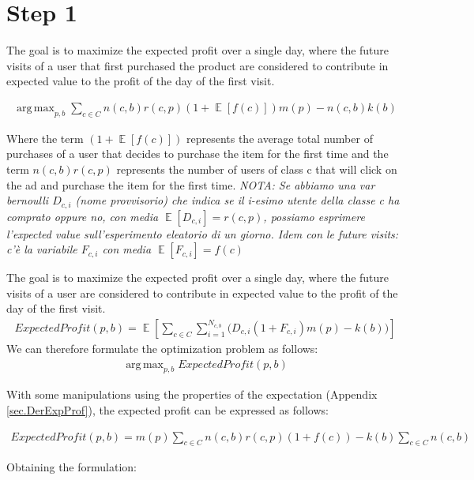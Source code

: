 \documentclass[11pt]{article} %
\DeclareMathOperator{\EX}{\mathbb{E}}
\DeclareMathOperator*{\argmax}{arg\,max}
\begin{document}
\section{Step 1}
{\color{red}
The goal is to maximize the expected profit over a single day, where the future visits of a user that first purchased the product are considered to contribute in expected value to the profit of the day of the first visit.

\begin{align*}
\argmax_{p,b}{\sum_{c \in C}{n(c,b)r(c,p)(1+\EX[f(c)])m(p)-n(c,b)k(b)}}
\end{align*}

Where the term $(1+\EX[f(c)])$ represents the average total number of purchases of a user that decides to purchase the item for the first time and the term $n(c,b)r(c,p)$ represents the number of users of class c that will click on the ad and purchase the item for the first time.
\newline
\newline
\textit{NOTA: Se abbiamo una var bernoulli $D_{c,i}$ (nome provvisorio) che indica se il i-esimo utente della classe c ha comprato oppure no, con media $\EX[D_{c,i}]=r(c,p)$, possiamo esprimere l'expected value sull'esperimento eleatorio di un giorno.
Idem con le future visits: c'è la variabile $F_{c,i}$ con media $\EX[F_{c,i}]=f(c)$}
}
\newline
\newline
The goal is to maximize the expected profit over a single day, where the future visits of a user are considered to contribute in expected value to the profit of the day of the first visit.
\begin{align*}
ExpectedProfit(p,b) = \EX\left[\sum_{c \in C}{\sum_{i =1}^{N_{c,b}}{\bigg( D_{c,i}(1+F_{c,i})m(p)-k(b)\bigg)}}\right]
\end{align*}
We can therefore formulate the optimization problem as follows:
\begin{align*}
\argmax_{p,b}{ExpectedProfit(p,b)}
\end{align*}

With some manipulations using the properties of the expectation (Appendix \ref{sec.DerExpProf}), the expected profit can be expressed as follows:

\begin{align*}
ExpectedProfit(p,b)=m(p)\sum_{c \in C}{n(c,b)r(c,p)(1+f(c))}-k(b)\sum_{c \in C}{n(c,b)}
\end{align*}

Obtaining the formulation:
\end{document}
